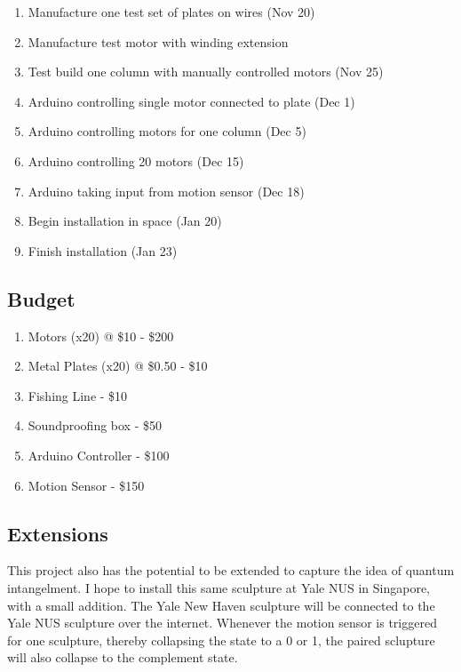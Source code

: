 \begin{enumerate}
\item Manufacture one test set of plates on wires (Nov 20)
\item Manufacture test motor with winding extension
\item Test build one column with manually controlled motors (Nov 25)
\item Arduino controlling single motor connected to plate (Dec 1)
\item Arduino controlling motors for one column (Dec 5)
\item Arduino controlling 20 motors (Dec 15)
\item Arduino taking input from motion sensor (Dec 18)
\item Begin installation in space (Jan 20)
\item Finish installation (Jan 23)
\end{enumerate}

\subsection{Budget}

\begin{enumerate}
\item Motors (x20) @ \$10 - \$200
\item Metal Plates (x20) @ \$0.50 - \$10
\item Fishing Line - \$10
\item Soundproofing box - \$50
\item Arduino Controller - \$100
\item Motion Sensor - \$150
\end{enumerate}

\subsection{Extensions}

This project also has the potential to be extended to capture the idea of quantum intangelment.
I hope to install this same sculpture at Yale NUS in Singapore, with a small addition.
The Yale New Haven sculpture will be connected to the Yale NUS sculpture over the internet.
Whenever the motion sensor is triggered for one sculpture, thereby collapsing the state to a 0 or 1, the paired sclupture will also collapse to the complement state.


